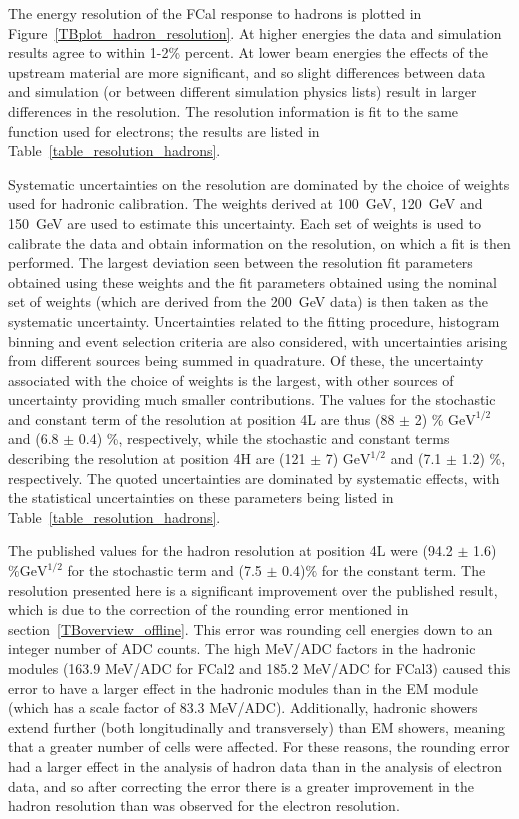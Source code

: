 The energy resolution of the FCal response to hadrons is plotted in Figure~\ref{TBplot_hadron_resolution}. At higher energies the data and simulation results agree to within 1-2\% percent. At lower beam energies the effects of the upstream material are more significant, and so slight differences between data and simulation (or between different simulation physics lists) result in larger differences in the resolution.  The resolution information is fit to the same function used for electrons; the results are listed in Table~\ref{table_resolution_hadrons}. 



Systematic uncertainties on the resolution are dominated by the choice of weights used for hadronic calibration. The weights derived at 100~GeV, 120~GeV and 150~GeV are used to estimate this uncertainty. Each set of weights is used to calibrate the data and obtain information on the resolution, on which a fit is then performed. The largest deviation seen between the resolution fit parameters obtained using these weights and the fit parameters obtained using the nominal set of weights (which are derived from the 200~GeV data) is then taken as the systematic uncertainty. Uncertainties related to the fitting procedure, histogram binning and event selection criteria are also considered, with uncertainties arising from different sources being summed in quadrature. Of these, the uncertainty associated with the choice of weights is the largest, with other sources of uncertainty providing much smaller contributions. The values for the stochastic and constant term of the resolution at position 4L are thus (88 $\pm$ 2) \% $\mathrm{GeV}^{1/2}$ and (6.8 $\pm$ 0.4) \%, respectively, while the stochastic and constant terms describing the resolution at position 4H are (121 $\pm$ 7) $\mathrm{GeV}^{1/2}$ and (7.1 $\pm$ 1.2) \%, respectively. The quoted uncertainties are dominated by systematic effects, with the statistical uncertainties on these parameters being listed in Table~\ref{table_resolution_hadrons}.

The published values for the hadron resolution at position 4L were (94.2 $\pm$ 1.6) $\%\mathrm{GeV}^{1/2}$ for the stochastic term and (7.5 $\pm$ 0.4)$\%$ for the constant term. The resolution presented here is a significant improvement over the published result, which is due to the correction of the rounding error mentioned in section~\ref{TBoverview_offline}. This error was rounding cell energies down to an integer number of ADC counts. The high MeV/ADC factors in the hadronic modules (163.9 MeV/ADC for FCal2 and 185.2 MeV/ADC for FCal3) caused this error to have a larger effect in the hadronic modules than in the EM module (which has a scale factor of 83.3 MeV/ADC). Additionally, hadronic showers  extend further (both longitudinally and transversely) than EM showers, meaning that a greater number of cells were affected. For these reasons, the rounding error had a larger effect in the analysis of hadron data than in the analysis of electron data, and so after correcting the error there is a greater improvement in the hadron resolution than was observed for the electron resolution.




